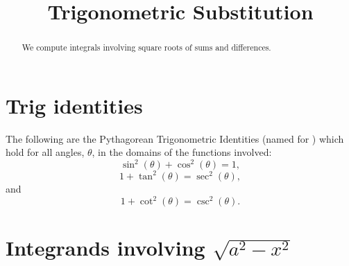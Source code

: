 \documentclass{ximera}
\title{Trigonometric Substitution}
\begin{document}
\begin{abstract}
We compute integrals involving square roots of sums and differences.
\end{abstract}

\maketitle

\section{Trig identities}

The following are the Pythagorean Trigonometric Identities (named for ) 
which hold for all angles,
$\theta$, in the domains of the functions involved:
\[
\sin^2(\theta) + \cos^2(\theta) = 1,
\]
\[
1 + \tan^2(\theta) = \sec^2(\theta),
\]
and
\[
1 + \cot^2(\theta) = \csc^2(\theta).
\]



\section{Integrands involving $\sqrt{a^2 - x^2}$}
\end{document}
